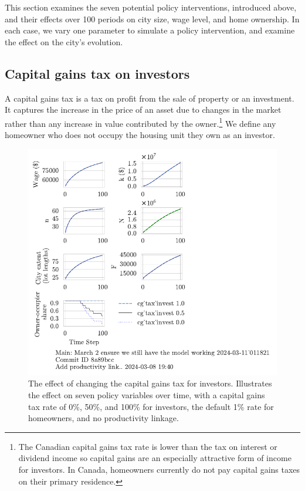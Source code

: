 This section examines the seven potential policy interventions, introduced above, and their effects over 100 periods on city size, wage level, and home ownership. In each case, we vary one parameter to simulate a policy  intervention, %
and examine the effect on the city's evolution.

\subsection{Capital gains tax on investors}
A \gls{capital gains} tax is a tax on profit from the sale of property or an investment. It captures the increase in the price of an asset due to changes in the market rather than any increase in value contributed by the owner.\footnote{The Canadian capital gains tax rate is lower than the tax on interest or dividend income so capital gains are an especially attractive form of income for investors. In Canada, homeowners currently do not pay capital gains taxes on their primary residence. %
} We define any homeowner who does not occupy the housing unit they own as an investor. 

\begin{figure}[!hbtp]
\centering
\includegraphics[scale=1.1, trim={0 1.4cm 4cm 0},clip]{fig/cg_tax_invest-Main-011821.pdf}
\caption[The effect of changing the capital gains tax for investors]{The effect of changing the capital gains tax for investors. Illustrates the effect on seven policy variables over time, with a capital gains tax rate of 0\%, 50\%, and 100\% for investors, the default 1\% rate for homeowners, and no productivity linkage.}
\label{fig:CGinvest_ownership_trajectory}
\end{figure}

